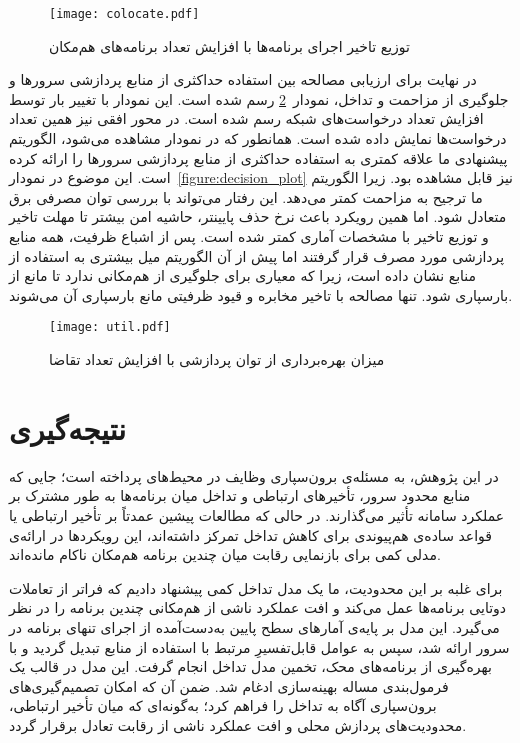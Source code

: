 \vspace{0.5cm}
\begin{figure}[h]
\centering
\texttt{[image: colocate.pdf]}
\caption{توزیع تاخیر اجرای برنامه‌ها با افزایش تعداد برنامه‌های هم‌مکان}
\label{figure:colocate_plot}
\end{figure}
\vspace{0.5cm}

در نهایت برای ارزیابی مصالحه بین استفاده حداکثری از منابع پردازشی سرورها و جلوگیری از مزاحمت و تداخل، نمودار~\ref{figure:util_plot} رسم شده است. این نمودار با تغییر بار توسط افزایش تعداد درخواست‌های شبکه رسم شده است. در محور افقی نیز همین تعداد درخواست‌ها نمایش داده شده است. همانطور که در نمودار مشاهده می‌شود، الگوریتم پیشنهادی ما علاقه کمتری به استفاده حداکثری از منابع پردازشی سرورها را ارائه کرده است. این موضوع در نمودار~\ref{figure:decision_plot} نیز قابل مشاهده بود. زیرا الگوریتم ما ترجیح به مزاحمت کمتر می‌دهد. این رفتار می‌تواند با بررسی توان مصرفی برق متعادل شود. اما همین رویکرد باعث نرخ حذف پایینتر، حاشیه امن بیشتر تا مهلت تاخیر و توزیع تاخیر با مشخصات آماری کمتر شده است. پس از اشباع ظرفیت، همه منابع پردازشی مورد مصرف قرار گرفتند اما پیش از آن الگوریتم  میل بیشتری به استفاده از منابع نشان داده است، زیرا که معیاری برای جلوگیری از هم‌مکانی ندارد تا مانع از بارسپاری شود. تنها مصالحه با تاخیر مخابره و قیود ظرفیتی مانع بارسپاری آن می‌شوند.

\vspace{0.5cm}
\begin{figure}[h]
\centering
\texttt{[image: util.pdf]}
\caption{میزان بهره‌برداری از توان پردازشی با افزایش تعداد تقاضا}
\label{figure:util_plot}
\end{figure}
\vspace{0.5cm}

\section{نتیجه‌گیری}
در این پژوهش، به مسئله‌ی برون‌سپاری وظایف در محیط‌های  پرداخته است؛ جایی که منابع محدود سرور، تأخیرهای ارتباطی و تداخل میان برنامه‌ها به طور مشترک بر عملکرد سامانه تأثیر می‌گذارند. در حالی که مطالعات پیشین عمدتاً بر تأخیر ارتباطی یا قواعد ساده‌ی هم‌پیوندی برای کاهش تداخل تمرکز داشته‌اند، این رویکردها در ارائه‌ی مدلی کمی برای بازنمایی رقابت میان چندین برنامه هم‌مکان ناکام مانده‌اند. 

برای غلبه بر این محدودیت، ما یک مدل تداخل کمی پیشنهاد دادیم که فراتر از تعاملات دوتایی برنامه‌ها عمل می‌کند و افت عملکرد ناشی از هم‌مکانی چندین برنامه را در نظر می‌گیرد. این مدل بر پایه‌ی آمارهای سطح پایین به‌دست‌آمده از اجرای تنهای برنامه در سرور ارائه شد، سپس به عوامل قابل‌تفسیرِ مرتبط با استفاده از منابع تبدیل گردید و با بهره‌گیری از برنامه‌های محک، تخمین مدل تداخل انجام گرفت. این مدل در قالب یک فرمول‌بندی مساله بهینه‌سازی ادغام شد. ضمن آن که امکان تصمیم‌گیری‌های برون‌سپاری آگاه به تداخل را فراهم کرد؛ به‌گونه‌ای که میان تأخیر ارتباطی، محدودیت‌های پردازش محلی و افت عملکرد ناشی از رقابت تعادل برقرار گردد.

